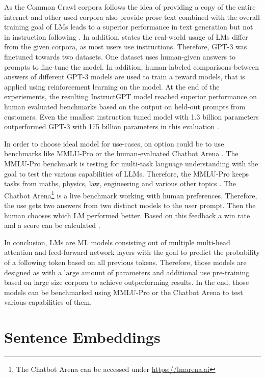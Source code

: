 \documentclass[a4paper,oneside,bibliography=totoc]{scrbook}
\begin{document}
As the Common Crawl corpora follows the idea of providing a copy of the entire internet \cite{CCF2025} and other used corpora also provide prose text combined with the overall training goal of \acp{LM} leads to a superior performance in text generation but not in instruction following \cite{Ouyang2022}. In addition, \citet{Ouyang2022} states the real-world usage of \acp{LM} differ from the given corpora, as most users use instructions. Therefore, \ac{GPT}-3 was finetuned towards two datasets. One dataset uses human-given answers to prompts to fine-tune the model. In addition, human-labeled comparisons between answers of different \ac{GPT}-3 models are used to train a reward models, that is applied using reinforcement learning on the model. At the end of the experiements, the resulting InstructGPT model reached superior performance on human evaluated benchmarks based on the output on held-out prompts from customers. Even the smallest instruction tuned model with 1.3 billion parameters outperformed \ac{GPT}-3 with 175 billion parameters in this evaluation \cite{Ouyang2022}.

In order to choose ideal model for use-cases, on option could be to use benchmarks like MMLU-Pro \cite{Wang2024} or the human-evaluated Chatbot Arena \cite{Chiang2024}. The MMLU-Pro benchmark is testing for multi-task language understanding with the goal to test the various capabilities of LLMs. Therefore, the MMLU-Pro keeps tasks from maths, physics, law, engineering and various other topics \cite{Wang2024}. The Chatbot Arena\footnote{The Chatbot Arena can be accessed under \url{https://lmarena.ai}} is a live benchmark working with human preferences. Therefore, the use gets two answers from two distinct models to the user prompt. Then the human chooses which \ac{LM} performed better. Based on this feedback a win rate and a score can be calculated \cite{Chiang2024}.

In conclusion, \acp{LM} are \ac{ML} models consisting out of multiple multi-head attention and feed-forward network layers with the goal to predict the probability of a following token based on all previous tokens. Therefore, those models are designed as with a large amount of parameters and additional use pre-training based on large size corpora to achieve outperforming results. In the end, those models can be benchmarked using MMLU-Pro or the Chatbot Arena to test various capabilities of them.

\section{Sentence Embeddings}
\label{sec:sentence_embeddings}
\end{document}

